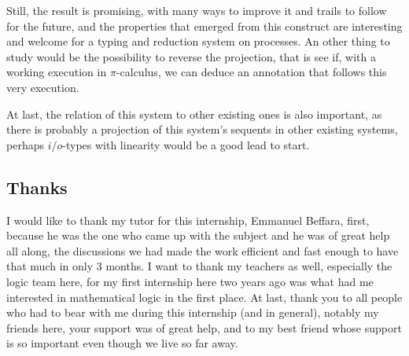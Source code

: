 Still, the result is promising, with many ways to improve it and trails to follow for the future, and the properties that emerged from this construct are interesting and welcome for a typing and reduction system on processes. An other thing to study would be the possibility to reverse the projection, that is see if, with a working execution in $\pi$-calculus, we can deduce an annotation that follows this very execution.

At last, the relation of this system to other existing ones is also important, as there is probably a projection of this system's sequents in other existing systems, perhaps $i/o$-types with linearity would be a good lead to start.

\bigskip

\subsection*{Thanks}

I would like to thank my tutor for this internship, Emmanuel Beffara, first, because he was the one who came up with the subject and he was of great help all along, the discussions we had made the work efficient and fast enough to have that much in only 3 months. I want to thank my teachers as well, especially the logic team here, for my first internship here two years ago was what had me interested in mathematical logic in the first place. At last, thank you to all people who had to bear with me during this internship (and in general), notably my friends here, your support was of great help, and to my best friend whose support is so important even though we live so far away.